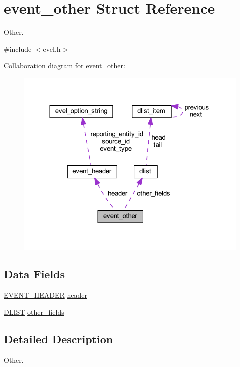 \hypertarget{structevent__other}{}\section{event\+\_\+other Struct Reference}
\label{structevent__other}


Other.  




{\ttfamily \#include $<$evel.\+h$>$}



Collaboration diagram for event\+\_\+other\+:
\nopagebreak
\begin{figure}[H]
\begin{center}
\leavevmode
\includegraphics[width=320pt]{structevent__other__coll__graph}
\end{center}
\end{figure}
\subsection*{Data Fields}
\begin{DoxyCompactItemize}
\item 
\hyperlink{evel_8h_aa0ea94c675729365ea7825c4fc7e06d8}{E\+V\+E\+N\+T\+\_\+\+H\+E\+A\+D\+ER} \hyperlink{structevent__other_a0df632a7a35d9e93a803b6ffd42722fb}{header}
\item 
\hyperlink{double__list_8h_a45f4a129042d9e1aa4ffd31fe13e4d14}{D\+L\+I\+ST} \hyperlink{structevent__other_a8e1fd2c5e52810065556065f453480bb}{other\+\_\+fields}
\end{DoxyCompactItemize}


\subsection{Detailed Description}
Other. 

